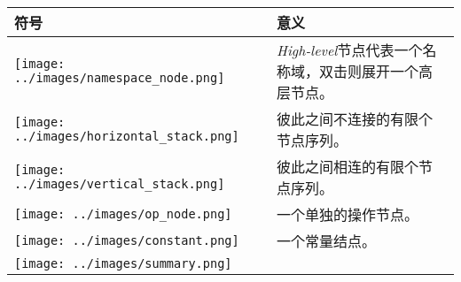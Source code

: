 \begin{longtable}[c]{@{}ll@{}}
\toprule
\begin{minipage}[b]{0.05\columnwidth}\raggedright\strut
符号
\strut\end{minipage} &
\begin{minipage}[b]{0.05\columnwidth}\raggedright\strut
意义
\strut\end{minipage}\tabularnewline
\midrule
\endhead
\begin{minipage}[t]{0.05\columnwidth}\raggedright\strut
\texttt{[image: ../images/namespace\_node.png]}
\strut\end{minipage} &
\begin{minipage}[t]{0.05\columnwidth}\raggedright\strut
\emph{High-level}节点代表一个名称域，双击则展开一个高层节点。
\strut\end{minipage}\tabularnewline
\begin{minipage}[t]{0.05\columnwidth}\raggedright\strut
\texttt{[image: ../images/horizontal\_stack.png]}
\strut\end{minipage} &
\begin{minipage}[t]{0.05\columnwidth}\raggedright\strut
彼此之间不连接的有限个节点序列。
\strut\end{minipage}\tabularnewline
\begin{minipage}[t]{0.05\columnwidth}\raggedright\strut
\texttt{[image: ../images/vertical\_stack.png]}
\strut\end{minipage} &
\begin{minipage}[t]{0.05\columnwidth}\raggedright\strut
彼此之间相连的有限个节点序列。
\strut\end{minipage}\tabularnewline
\begin{minipage}[t]{0.05\columnwidth}\raggedright\strut
\texttt{[image: ../images/op\_node.png]}
\strut\end{minipage} &
\begin{minipage}[t]{0.05\columnwidth}\raggedright\strut
一个单独的操作节点。
\strut\end{minipage}\tabularnewline
\begin{minipage}[t]{0.05\columnwidth}\raggedright\strut
\texttt{[image: ../images/constant.png]}
\strut\end{minipage} &
\begin{minipage}[t]{0.05\columnwidth}\raggedright\strut
一个常量结点。
\strut\end{minipage}\tabularnewline
\begin{minipage}[t]{0.05\columnwidth}\raggedright\strut
\texttt{[image: ../images/summary.png]}

\end{minipage}
\end{longtable}
